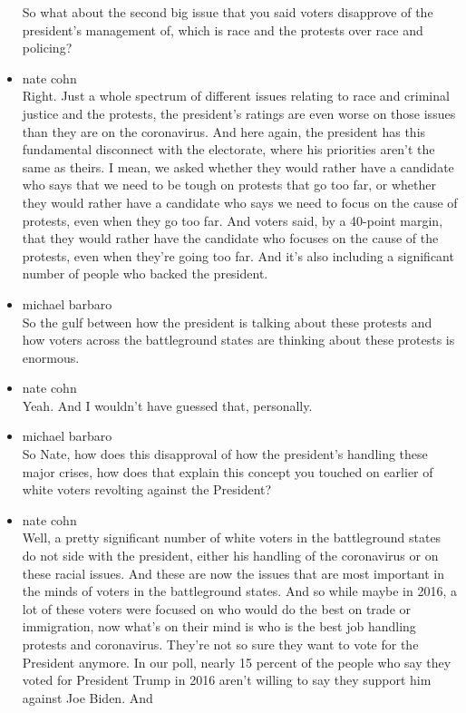 \begin{itemize}
  So what about the second big issue that you said voters disapprove of
  the president's management of, which is race and the protests over
  race and policing?
\item
  nate cohn\\
  Right. Just a whole spectrum of different issues relating to race and
  criminal justice and the protests, the president's ratings are even
  worse on those issues than they are on the coronavirus. And here
  again, the president has this fundamental disconnect with the
  electorate, where his priorities aren't the same as theirs. I mean, we
  asked whether they would rather have a candidate who says that we need
  to be tough on protests that go too far, or whether they would rather
  have a candidate who says we need to focus on the cause of protests,
  even when they go too far. And voters said, by a 40-point margin, that
  they would rather have the candidate who focuses on the cause of the
  protests, even when they're going too far. And it's also including a
  significant number of people who backed the president.
\item
  michael barbaro\\
  So the gulf between how the president is talking about these protests
  and how voters across the battleground states are thinking about these
  protests is enormous.
\item
  nate cohn\\
  Yeah. And I wouldn't have guessed that, personally.
\item
  michael barbaro\\
  So Nate, how does this disapproval of how the president's handling
  these major crises, how does that explain this concept you touched on
  earlier of white voters revolting against the President?
\item
  nate cohn\\
  Well, a pretty significant number of white voters in the battleground
  states do not side with the president, either his handling of the
  coronavirus or on these racial issues. And these are now the issues
  that are most important in the minds of voters in the battleground
  states. And so while maybe in 2016, a lot of these voters were focused
  on who would do the best on trade or immigration, now what's on their
  mind is who is the best job handling protests and coronavirus. They're
  not so sure they want to vote for the President anymore. In our poll,
  nearly 15 percent of the people who say they voted for President Trump
  in 2016 aren't willing to say they support him against Joe Biden. And

\end{itemize}
